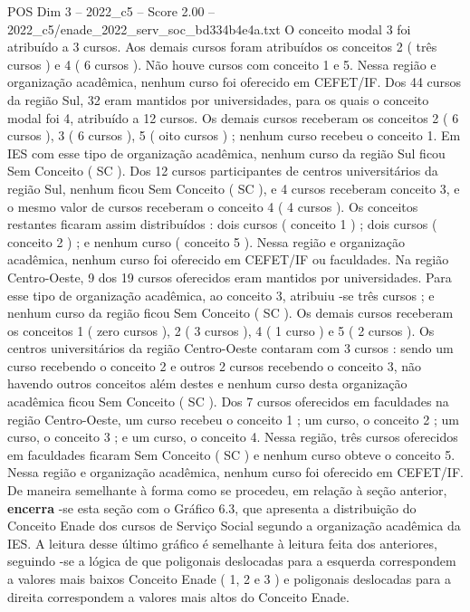 \begin{textsample}{POS Dim 3 – 2022\_c5 – Score 2.00 – 2022\_c5/enade\_2022\_serv\_soc\_bd334b4e4a.txt}
O conceito modal 3 foi atribuído a 3 cursos.
Aos demais cursos foram atribuídos os conceitos 2 ( três cursos ) e 4 ( 6 cursos ).
Não houve cursos com conceito 1 e 5.
Nessa região e organização acadêmica, nenhum curso foi oferecido em CEFET/IF.
Dos 44 cursos da região Sul, 32 eram mantidos por universidades, para os quais o conceito modal foi 4, atribuído a 12 cursos.
Os demais cursos receberam os conceitos 2 ( 6 cursos ), 3 ( 6 cursos ), 5 ( oito cursos ) ; nenhum curso recebeu o conceito 1.
Em IES com esse tipo de organização acadêmica, nenhum curso da região Sul ficou Sem Conceito ( SC ).
Dos 12 cursos participantes de centros universitários da região Sul, nenhum ficou Sem Conceito ( SC ), e 4 cursos receberam conceito 3, e o mesmo valor de cursos receberam o conceito 4 ( 4 cursos ).
Os conceitos restantes ficaram assim distribuídos : dois cursos ( conceito 1 ) ; dois cursos ( conceito 2 ) ; e nenhum curso ( conceito 5 ).
Nessa região e organização acadêmica, nenhum curso foi oferecido em CEFET/IF ou faculdades.
Na região Centro-Oeste, 9 dos 19 cursos oferecidos eram mantidos por universidades.
Para esse tipo de organização acadêmica, ao conceito 3, atribuiu -se três cursos ; e nenhum curso da região ficou Sem Conceito ( SC ).
Os demais cursos receberam os conceitos 1 ( zero cursos ), 2 ( 3 cursos ), 4 ( 1 curso ) e 5 ( 2 cursos ).
Os centros universitários da região Centro-Oeste contaram com 3 cursos : sendo um curso recebendo o conceito 2 e outros 2 cursos recebendo o conceito 3, não havendo outros conceitos além destes e nenhum curso desta organização acadêmica ficou Sem Conceito ( SC ).
Dos 7 cursos oferecidos em faculdades na região Centro-Oeste, um curso recebeu o conceito 1 ; um curso, o conceito 2 ; um curso, o conceito 3 ; e um curso, o conceito 4.
Nessa região, três cursos oferecidos em faculdades ficaram Sem Conceito ( SC ) e nenhum curso obteve o conceito 5.
Nessa região e organização acadêmica, nenhum curso foi oferecido em CEFET/IF.
De maneira semelhante à forma como se procedeu, em relação à seção anterior, \textbf{encerra} -se esta seção com o Gráfico 6.3, que apresenta a distribuição do Conceito Enade dos cursos de Serviço Social segundo a organização acadêmica da IES.
A leitura desse último gráfico é semelhante à leitura feita dos anteriores, seguindo -se a lógica de que poligonais deslocadas para a esquerda correspondem a valores mais baixos Conceito Enade ( 1, 2 e 3 ) e poligonais deslocadas para a direita correspondem a valores mais altos do Conceito Enade.

\end{textsample}

